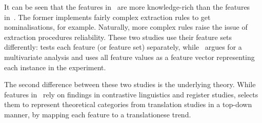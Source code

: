 It can be seen that the features in~\citet{Evert2017} are more knowledge-rich than the features in~\citet{Volansky2015}. The former implements fairly complex extraction rules to get nominalisations, for example. Naturally, more complex rules raise the issue of extraction procedures reliability. These two studies use their feature sets differently: \citet{Volansky2015} tests each feature (or feature set) separately, while~\citet{Evert2017} argues for a multivariate analysis and uses all feature values as a feature vector representing each instance in the experiment.   


%

The second difference between these two studies is the underlying theory. While features in~\citet{Evert2017} rely on findings in contrastive linguistics and register studies, \citet{Volansky2015} selects them to represent theoretical categories from translation studies in a top-down manner, by mapping each feature to a translationese trend. 

